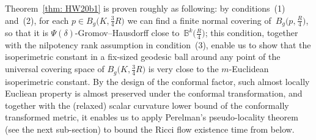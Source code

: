 \documentclass[pdftex]{sigma}
\numberwithin{equation}{section}
\begin{document}
Theorem~\ref{thm: HW20b1} is proven roughly as following: by
conditions~(1) and~(2), for each $p\in B_g\big(K,\frac{3}{4}R\big)$ we can find a finite
normal covering of~$B_g\big(p,\frac{R}{4}\big)$, so that it is
$\Psi(\delta)$-Gromov--Hausdorff close to~$\mathbb{B}^k\big(\frac{R}{4}\big)$; this
condition, together with the nilpotency rank assumption in condition~(3),
enable us to show that the isoperimetric constant in a fix-sized geodesic ball
around any point of the universal covering space of $B_g\big(K,\frac{3}{4}R\big)$ is
very close to the $m$-Euclidean isoperimetric constant. By the design of the
conformal factor, such almost locally Eucliean property is almost
preserved under the conformal transformation, and together with the (relaxed)
scalar curvature lower bound of the conformally transformed metric, it enables
us to apply Perelman's pseudo-locality theorem (see the next sub-section) to bound
the Ricci flow existence time from below.
\end{document}

